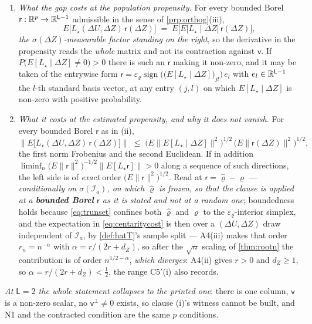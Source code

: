 \begin{corollary}
\begin{enumerate}
\item[(ii)] \emph{What the gap costs at the population propensity.} For every bounded Borel
$\mathsf r:\mathbb{R}^{p}\to\mathbb{R}^{\mathsf L-1}$ admissible in the sense of \cref{prp:orthog}\textup{(iii)},
\[
E\big[L_\star(\Delta U,\Delta Z)\,\mathsf r(\Delta Z)\big]
\;=\;E\Big[E\big[L_\star\mid\Delta Z\big]\,\mathsf r(\Delta Z)\Big] ,
\]
\emph{the $\sigma(\Delta Z)$-measurable factor standing on the right}, so the derivative in the
propensity reads the \emph{whole} matrix and not its contraction against $\mathsf v$. If
$P\big(E[L_\star\mid\Delta Z]\ne0\big)>0$ there is such an $\mathsf r$ making it non-zero, and it may be
taken of the entrywise form
$\mathsf r=\varepsilon_\varrho\operatorname{sign}\big(\big(E[L_\star\mid\Delta Z]\big)_{jl}\big)\,e_l$
with $e_l\in\mathbb{R}^{\mathsf L-1}$ the $l$-th standard basis vector, at any entry $(j,l)$ on which
$E[L_\star\mid\Delta Z]$ is non-zero with positive probability.
\item[(iii)] \emph{What it costs at the estimated propensity, and why it does not vanish.} For every
bounded Borel $\mathsf r$ as in \textup{(ii)},
\begin{equation}\label{eq:centaritycost}
\Big\|E\big[L_\star(\Delta U,\Delta Z)\,\mathsf r(\Delta Z)\big]\Big\|
\;\le\;\Big(E\big\|E[L_\star\mid\Delta Z]\big\|^{2}\Big)^{1/2}\,
\big(E\|\mathsf r(\Delta Z)\|^{2}\big)^{1/2} ,
\end{equation}
the first norm Frobenius and the second Euclidean. If in addition
$\liminf_n\big(E\|\mathsf r\|^{2}\big)^{-1/2}\big\|E[L_\star\mathsf r]\big\|>0$ along a sequence of such
directions, the left side is of \emph{exact} order $\big(E\|\mathsf r\|^{2}\big)^{1/2}$. Read at
$\mathsf r=\hat\varrho-\varrho$ --- \emph{conditionally on $\sigma(\mathcal I_a)$, on which $\hat\varrho$
is frozen, so that the clause is applied at a \textbf{bounded Borel} $\mathsf r$ as it is stated and not
at a random one}; boundedness holds because \eqref{eq:trunset} confines both $\hat\varrho$ and $\varrho$
to the $\varepsilon_\varrho$-interior simplex, and the expectation in \eqref{eq:centaritycost} is then
over a $(\Delta U,\Delta Z)$ draw independent of $\mathcal I_a$, by \cref{def:hatT}'s sample
split --- A4(iii) makes that order $r_n=n^{-\alpha}$ with
$\alpha=r/(2r+d_Z)$, so after the $\sqrt n$ scaling of \cref{thm:rootn} the contribution is of order
$n^{1/2-\alpha}$, \emph{which diverges}: A4(ii) gives $r>0$ and $d_Z\ge1$, so
$\alpha=r/(2r+d_Z)<\tfrac12$, the range C5$'$(i) also records.
\end{enumerate}
\emph{At $\mathsf L=2$ the whole statement collapses to the printed one}: there is one column,
$\mathsf v$ is a non-zero scalar, no $\mathsf v^{\perp}\ne0$ exists, so clause \textup{(i)}'s witness
cannot be built, and N1 and the contracted condition are the same $p$ conditions.
\end{corollary}

